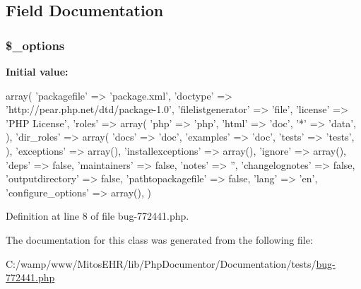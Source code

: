 \subsection{\-Field \-Documentation}
\hypertarget{classbug__772441_a1bebdc689c84eee59ad24c77e5531762}{
\subsubsection[{\$\-\_\-options}]{\setlength{\rightskip}{0pt plus 5cm}\$\-\_\-options}}\label{classbug__772441_a1bebdc689c84eee59ad24c77e5531762}
{\bfseries \-Initial value\-:}
\begin{DoxyCode}
 array(
                      'packagefile' => 'package.xml',
                      'doctype' => 'http://pear.php.net/dtd/package-1.0',
                      'filelistgenerator' => 'file',
                      'license' => 'PHP License',
                      'roles' =>
                        array(
                                        'php' => 'php',
                                        'html' => 'doc',
                                        '*' => 'data',
                             ),
                      'dir_roles' =>
                        array(
                                                'docs' => 'doc',
                                                'examples' => 'doc',
                                                'tests' => 'tests',
                             ),
                      'exceptions' => array(),
                      'installexceptions' => array(),
                      'ignore' => array(),
                      'deps' => false,
                      'maintainers' => false,
                      'notes' => '',
                      'changelognotes' => false,
                      'outputdirectory' => false,
                      'pathtopackagefile' => false,
                      'lang' => 'en',
                      'configure_options' => array(),
                      )
\end{DoxyCode}


\-Definition at line 8 of file bug-\/772441.\-php.



\-The documentation for this class was generated from the following file\-:\begin{DoxyCompactItemize}
\item 
\-C\-:/wamp/www/\-Mitos\-E\-H\-R/lib/\-Php\-Documentor/\-Documentation/tests/\hyperlink{bug-772441_8php}{bug-\/772441.\-php}\end{DoxyCompactItemize}
